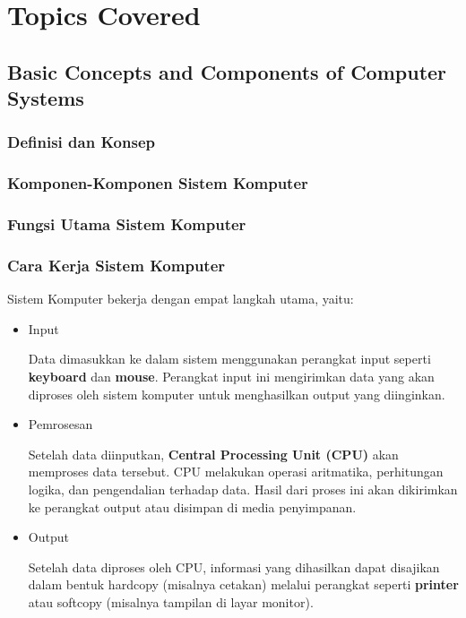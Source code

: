 \documentclass[12pt]{article}
\begin{document}
\section{Topics Covered}

\subsection{Basic Concepts and Components of Computer Systems}
\subsubsection{Definisi dan Konsep}
\subsubsection{Komponen-Komponen Sistem Komputer}
\subsubsection{Fungsi Utama Sistem Komputer}
\subsubsection{Cara Kerja Sistem Komputer}
Sistem Komputer bekerja dengan empat langkah utama, yaitu:
 \begin{itemize}
    \item {Input}
    
    Data dimasukkan ke dalam sistem menggunakan perangkat input seperti \textbf{keyboard} dan \textbf{mouse}. Perangkat input ini mengirimkan data yang akan diproses oleh sistem komputer untuk menghasilkan output yang diinginkan.
\end{itemize}
\begin{itemize}
    \item {Pemrosesan}

    Setelah data diinputkan, \textbf{Central Processing Unit (CPU)} akan memproses data tersebut. CPU melakukan operasi aritmatika, perhitungan logika, dan pengendalian terhadap data. Hasil dari proses ini akan dikirimkan ke perangkat output atau disimpan di media penyimpanan.
\end{itemize}

\begin{itemize}
    \item {Output}
    
    Setelah data diproses oleh CPU, informasi yang dihasilkan dapat disajikan dalam bentuk hardcopy (misalnya cetakan) melalui perangkat seperti \textbf{printer} atau softcopy (misalnya tampilan di layar monitor).
\end{itemize}
\end{document}

